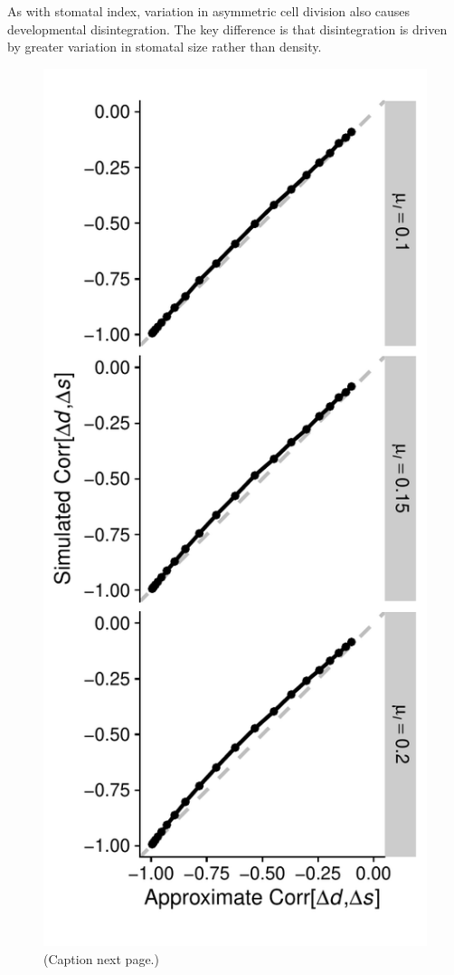 \documentclass[
  12pt,
]{article}
\begin{document}
As with stomatal index, variation in asymmetric cell division also causes developmental disintegration. The key difference is that disintegration is driven by greater variation in stomatal size rather than density.

\begin{figure}[ht]
\begin{center}
\includegraphics{../figures/check-approximation.pdf}
  \caption{(Caption next page.)}
  \label{fig:check-approximation}
\end{center}
\end{figure}
\addtocounter{figure}{-1}
\end{document}
